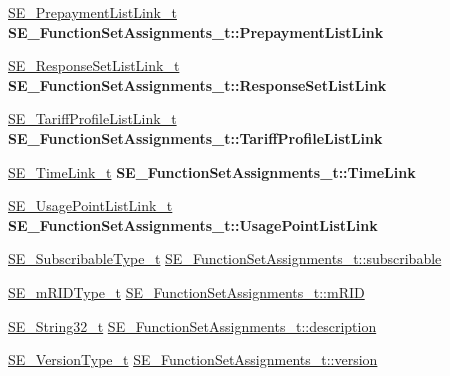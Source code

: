 \begin{DoxyCompactItemize}
\item 
\mbox{\label{group__FunctionSetAssignments_gab743ab8fbfb865bab3e868b5009ebefd}} 
\hyperlink{structSE__PrepaymentListLink__t}{S\+E\+\_\+\+Prepayment\+List\+Link\+\_\+t} {\bfseries S\+E\+\_\+\+Function\+Set\+Assignments\+\_\+t\+::\+Prepayment\+List\+Link}
\item 
\mbox{\label{group__FunctionSetAssignments_ga46c477314a19415786a9e3e950068f51}} 
\hyperlink{structSE__ResponseSetListLink__t}{S\+E\+\_\+\+Response\+Set\+List\+Link\+\_\+t} {\bfseries S\+E\+\_\+\+Function\+Set\+Assignments\+\_\+t\+::\+Response\+Set\+List\+Link}
\item 
\mbox{\label{group__FunctionSetAssignments_gab9ceb344e7f3b17d1784099221cdecbe}} 
\hyperlink{structSE__TariffProfileListLink__t}{S\+E\+\_\+\+Tariff\+Profile\+List\+Link\+\_\+t} {\bfseries S\+E\+\_\+\+Function\+Set\+Assignments\+\_\+t\+::\+Tariff\+Profile\+List\+Link}
\item 
\mbox{\label{group__FunctionSetAssignments_ga7cb00738e9c665091c6dae0182401389}} 
\hyperlink{structSE__TimeLink__t}{S\+E\+\_\+\+Time\+Link\+\_\+t} {\bfseries S\+E\+\_\+\+Function\+Set\+Assignments\+\_\+t\+::\+Time\+Link}
\item 
\mbox{\label{group__FunctionSetAssignments_ga69a5df7e6ade746d2d91d0e315016a2e}} 
\hyperlink{structSE__UsagePointListLink__t}{S\+E\+\_\+\+Usage\+Point\+List\+Link\+\_\+t} {\bfseries S\+E\+\_\+\+Function\+Set\+Assignments\+\_\+t\+::\+Usage\+Point\+List\+Link}
\item 
\hyperlink{group__SubscribableType_ga5c41f553d369710ed34619266bf2551e}{S\+E\+\_\+\+Subscribable\+Type\+\_\+t} \hyperlink{group__FunctionSetAssignments_ga08bccfbdb77b5bbf15fd21112db0f922}{S\+E\+\_\+\+Function\+Set\+Assignments\+\_\+t\+::subscribable}
\item 
\hyperlink{group__mRIDType_gac74622112f3a388a2851b2289963ba5e}{S\+E\+\_\+m\+R\+I\+D\+Type\+\_\+t} \hyperlink{group__FunctionSetAssignments_gaa16faad1f8ce02dc776c45a3df312b9a}{S\+E\+\_\+\+Function\+Set\+Assignments\+\_\+t\+::m\+R\+ID}
\item 
\hyperlink{group__String32_gac9f59b06b168b4d2e0d45ed41699af42}{S\+E\+\_\+\+String32\+\_\+t} \hyperlink{group__FunctionSetAssignments_ga93b00fabe30a35c1cbd436181e3c7d50}{S\+E\+\_\+\+Function\+Set\+Assignments\+\_\+t\+::description}
\item 
\hyperlink{group__VersionType_ga4b8d27838226948397ed99f67d46e2ae}{S\+E\+\_\+\+Version\+Type\+\_\+t} \hyperlink{group__FunctionSetAssignments_ga3d328d9c7ceed42375352905628206b8}{S\+E\+\_\+\+Function\+Set\+Assignments\+\_\+t\+::version}
\end{DoxyCompactItemize}


